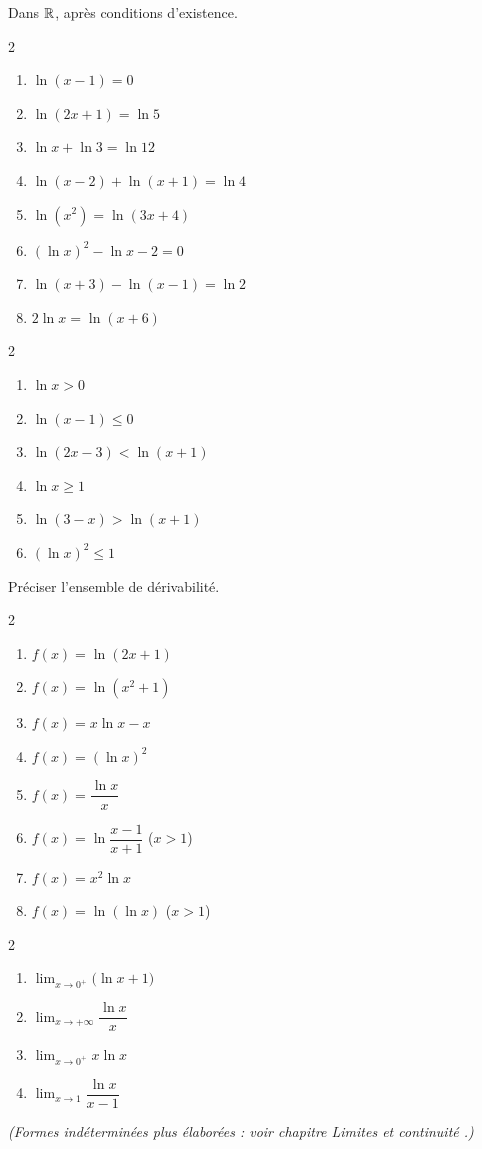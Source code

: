 Dans $\mathbb{R}$, après conditions d'existence.
\begin{multicols}{2}
\begin{enumerate}
	\item $\ln(x-1)=0$
	\item $\ln(2x+1)=\ln 5$
	\item $\ln x+\ln 3=\ln 12$
	\item $\ln(x-2)+\ln(x+1)=\ln 4$
	\item $\ln(x^{2})=\ln(3x+4)$
	\item $(\ln x)^{2}-\ln x-2=0$
	\item $\ln(x+3)-\ln(x-1)=\ln 2$
	\item $2\ln x=\ln(x+6)$
\end{enumerate}
\end{multicols}

\begin{multicols}{2}
\begin{enumerate}
	\item $\ln x>0$
	\item $\ln(x-1)\leq 0$
	\item $\ln(2x-3)<\ln(x+1)$
	\item $\ln x\geq 1$
	\item $\ln(3-x)>\ln(x+1)$
	\item $(\ln x)^{2}\leq 1$
\end{enumerate}
\end{multicols}

Préciser l'ensemble de dérivabilité.
\begin{multicols}{2}
\begin{enumerate}
	\item $f(x)=\ln(2x+1)$
	\item $f(x)=\ln(x^{2}+1)$
	\item $f(x)=x\ln x-x$
	\item $f(x)=(\ln x)^{2}$
	\item $f(x)=\dfrac{\ln x}{x}$
	\item $f(x)=\ln\!\dfrac{x-1}{x+1}$ \; ($x>1$)
	\item $f(x)=x^{2}\ln x$
	\item $f(x)=\ln(\ln x)$ \; ($x>1$)
\end{enumerate}
\end{multicols}

\begin{multicols}{2}
\begin{enumerate}
	\item $\displaystyle\lim_{x\to 0^+}\bigl(\ln x+1\bigr)$
	\item $\displaystyle\lim_{x\to+\infty}\dfrac{\ln x}{x}$
	\item $\displaystyle\lim_{x\to 0^+}x\ln x$
	\item $\displaystyle\lim_{x\to 1}\dfrac{\ln x}{x-1}$
\end{enumerate}
\end{multicols}
\emph{(Formes indéterminées plus élaborées : voir chapitre
\og Limites et continuité \fg.)}

